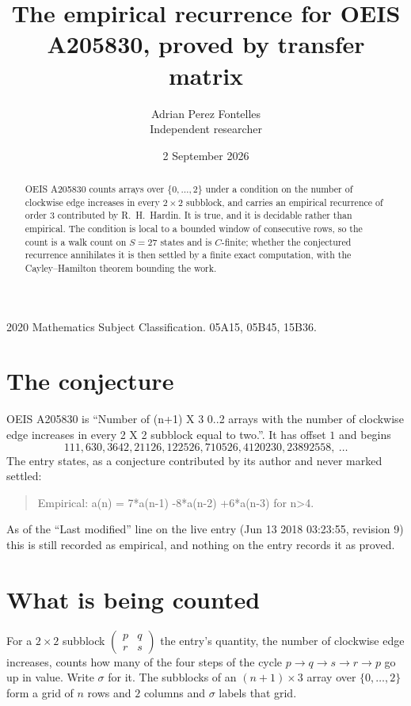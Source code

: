 \documentclass[11pt,a4paper]{article}
\title{The empirical recurrence for OEIS A205830, proved by transfer matrix}
\author{Adrian Perez Fontelles\\ \small Independent researcher}
\date{2 September 2026}
\theoremstyle{plain}
\theoremstyle{definition}
\begin{document}
\maketitle

\begin{abstract}
OEIS A205830 counts arrays over $\{0,\dots,2\}$ under a condition on the number of clockwise edge increases
in every $2\times2$ subblock, and carries an empirical recurrence of order $3$ contributed by
R.~H.~Hardin. It is true, and it is decidable rather than empirical. The condition is local to
a bounded window of consecutive rows, so the count is a walk count on $S=27$ states and is
$C$-finite; whether the conjectured recurrence annihilates it is then settled by a finite exact
computation, with the Cayley--Hamilton theorem bounding the work.
\end{abstract}

\noindent\small 2020 Mathematics Subject Classification. 05A15, 05B45, 15B36.\normalsize

\section{The conjecture}

OEIS A205830 is ``Number of (n+1) X 3 0..2 arrays with the number of clockwise edge increases in every 2 X 2 subblock equal to two.''. It has offset $1$ and begins
\[
111, 630, 3642, 21126, 122526, 710526, 4120230, 23892558,\ \dots
\]
The entry states, as a conjecture contributed by its author and never marked settled:
\begin{quote}
Empirical: a(n) = 7*a(n-1) -8*a(n-2) +6*a(n-3) for n>4.
\end{quote}
As of the ``Last modified'' line on the live entry (Jun 13 2018 03:23:55, revision 9) this is still
recorded as empirical, and nothing on the entry records it as proved.

\section{What is being counted}

For a $2\times2$ subblock $\begin{pmatrix}p&q\\r&s\end{pmatrix}$ the
entry's quantity, the number of clockwise edge increases, counts how many of the four steps of the cycle $p\to q\to s\to r\to p$ go up in value. Write $\sigma$ for it. The subblocks of an
$(n+1)\times3$ array over $\{0,\dots,2\}$ form a grid of $n$ rows and $2$
columns and $\sigma$ labels that grid.
\end{document}
